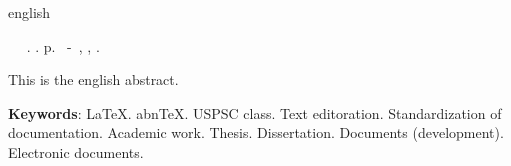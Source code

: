 \begin{resumo}[Abstract]
 \begin{otherlanguage*}{english}
	\begin{flushleft} 
		\setlength{\absparsep}{0pt} %
 		\SingleSpacing 
 		\imprimirautorabr~ ~\textbf{\imprimirtitleabstract}.	\imprimirdata.  \pageref{LastPage}p. 
		\imprimirtipotrabalho~-~\imprimirinstituicao, \imprimirlocal, 	\imprimirdata. 
 	\end{flushleft}
	\OnehalfSpacing 
   This is the english abstract.

   \vspace{\onelineskip}
 
   \noindent 
   \textbf{Keywords}: LaTeX. abnTeX. USPSC class. Text editoration. Standardization of documentation. Academic work. Thesis. Dissertation. Documents (development). Electronic documents.
 \end{otherlanguage*}
\end{resumo}
